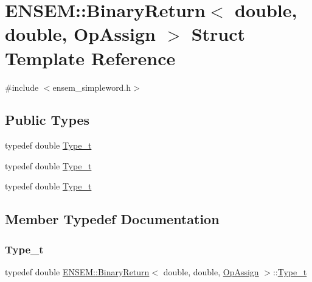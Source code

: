\hypertarget{structENSEM_1_1BinaryReturn_3_01double_00_01double_00_01OpAssign_01_4}{}\section{E\+N\+S\+EM\+:\+:Binary\+Return$<$ double, double, Op\+Assign $>$ Struct Template Reference}
\label{structENSEM_1_1BinaryReturn_3_01double_00_01double_00_01OpAssign_01_4}


{\ttfamily \#include $<$ensem\+\_\+simpleword.\+h$>$}

\subsection*{Public Types}
\begin{DoxyCompactItemize}
\item 
typedef double \mbox{\hyperlink{structENSEM_1_1BinaryReturn_3_01double_00_01double_00_01OpAssign_01_4_a69cfbbe6186e9203aee261817f4b3dbd}{Type\+\_\+t}}
\item 
typedef double \mbox{\hyperlink{structENSEM_1_1BinaryReturn_3_01double_00_01double_00_01OpAssign_01_4_a69cfbbe6186e9203aee261817f4b3dbd}{Type\+\_\+t}}
\item 
typedef double \mbox{\hyperlink{structENSEM_1_1BinaryReturn_3_01double_00_01double_00_01OpAssign_01_4_a69cfbbe6186e9203aee261817f4b3dbd}{Type\+\_\+t}}
\end{DoxyCompactItemize}


\subsection{Member Typedef Documentation}
\mbox{\label{structENSEM_1_1BinaryReturn_3_01double_00_01double_00_01OpAssign_01_4_a69cfbbe6186e9203aee261817f4b3dbd}} 
\subsubsection{\texorpdfstring{Type\_t}{Type\_t}\hspace{0.1cm}{\footnotesize\ttfamily [1/3]}}
{\footnotesize\ttfamily typedef double \mbox{\hyperlink{structENSEM_1_1BinaryReturn}{E\+N\+S\+E\+M\+::\+Binary\+Return}}$<$ double, double, \mbox{\hyperlink{structENSEM_1_1OpAssign}{Op\+Assign}} $>$\+::\mbox{\hyperlink{structENSEM_1_1BinaryReturn_3_01double_00_01double_00_01OpAssign_01_4_a69cfbbe6186e9203aee261817f4b3dbd}{Type\+\_\+t}}}

